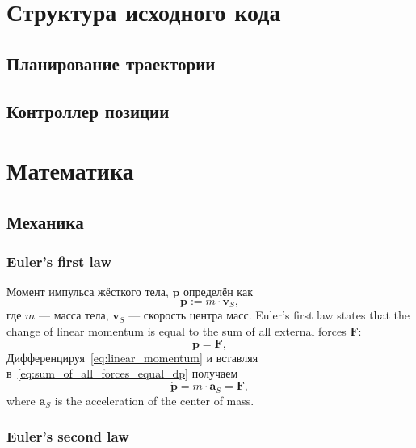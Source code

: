 \documentclass[12pt,a4paper,fleqn]{article}
\newcommand{\bVec}[1]{\mathbf{#1}}
\begin{document}
\section{Структура исходного кода}

\subsection{Планирование траектории}

\subsection{Контроллер позиции}

\section{Математика}

\subsection{Механика}

\subsubsection{Euler's first law}

Момент импульса жёсткого тела,
$\bVec{p}$ определён как 
%
\begin{equation}
	 \bVec{p} := m\cdot   \bVec{v}_S,
	 \label{eq:linear_momentum}
\end{equation}
%
где $m$ --- масса тела,
$\bVec{v}_S$ --- скорость центра масс.
Euler's first law states that the change of linear momentum is equal to the sum of all external forces $\bVec{F}$:
%
\begin{equation}
	\dot{\bVec{p}} =   \bVec{F},
	\label{eq:sum_of_all_forces_equal_dp}
\end{equation}
%
Дифференцируя~\eqref{eq:linear_momentum}
и вставляя в~\eqref{eq:sum_of_all_forces_equal_dp} получаем
%
\begin{equation}
	\dot{\bVec{p}} = m \cdot   \bVec{a}_S =   \bVec{F},
	\label{eq:pdot_equal_F}
\end{equation}
%
where $\bVec{a}_S$ is the acceleration of the center of mass.	

\subsubsection{Euler's second law}	
\end{document}
